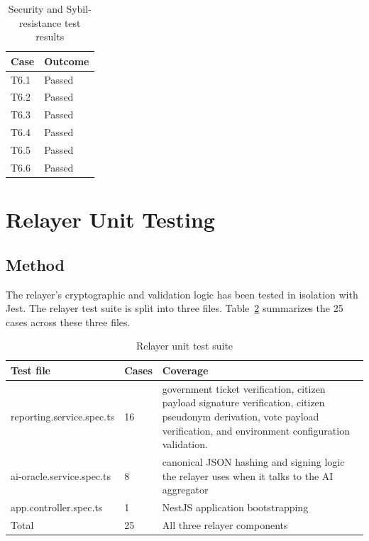 \begin{table}[htbp]
\centering
\caption{Security and Sybil-resistance test results}
\label{tab:security-results}
\begin{tabular}{p{}|p{}}
    
    Case & Outcome\\
    \hline
    T6.1 & Passed \\
    \hline
    T6.2 & Passed \\
    \hline
    T6.3 & Passed \\
    \hline
    T6.4 & Passed \\
    \hline
    T6.5 & Passed \\
    \hline
    T6.6 & Passed \\
    
\end{tabular}
\end{table}


\section{Relayer Unit Testing}
\label{sec:relayer-testing}

\subsection{Method}

The relayer's cryptographic and validation logic has been tested in isolation with Jest. The relayer test suite is split into three files. Table~\ref{tab:relayer-inventory} summarizes the 25 cases across these three files.


\begin{table}[htbp]
\centering
\caption{Relayer unit test suite}
\label{tab:relayer-inventory}
\begin{tabular}{p{}|p{}|p{}}
    
    Test file & Cases & Coverage \\
    \hline
    reporting.service.spec.ts & 16 & government ticket verification, citizen payload signature verification, citizen pseudonym derivation, vote payload verification, and environment configuration validation. \\
    \hline
   ai-oracle.service.spec.ts & 8 & canonical JSON hashing and signing logic the relayer uses when it talks to the AI aggregator \\
    \hline
    app.controller.spec.ts & 1 & NestJS application bootstrapping \\
    \hline
    Total & 25 & All three relayer components \\
    
\end{tabular}
\end{table}

